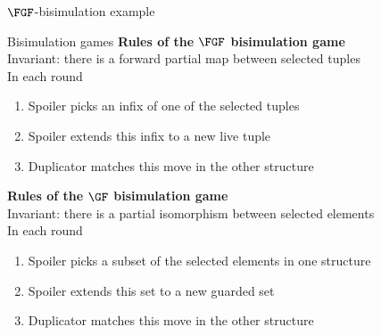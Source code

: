 \documentclass[aspectratio=169]{beamer}
\begin{document}
\begin{frame}{$\FGF$-bisimulation example}
  
\end{frame}

\begin{frame}{Bisimulation games}
  \textbf{Rules of the $\FGF$ bisimulation game}\\
  Invariant: there is a forward partial map between selected tuples\\[2ex]
  In each round \begin{minipage}{0.8\textwidth}
  \begin{enumerate}
    \item Spoiler picks an infix of one of the selected tuples
    \item Spoiler extends this infix to a new live tuple
    \item Duplicator matches this move in the other structure
  \end{enumerate}
  \end{minipage}

  \vspace{3ex}
  \pause
  \textbf{Rules of the \alert{$\GF$} bisimulation game}\\
  Invariant: there is a \alert{partial isomorphism} between selected \alert{elements}\\[2ex]
  In each round \begin{minipage}{0.82\textwidth}
  \begin{enumerate}
    \item Spoiler picks \alert{a subset} of the selected elements in one structure
    \item Spoiler extends this set to a new \alert{guarded set}
    \item Duplicator matches this move in the other structure
  \end{enumerate}
  \end{minipage}
\end{frame}
\end{document}
